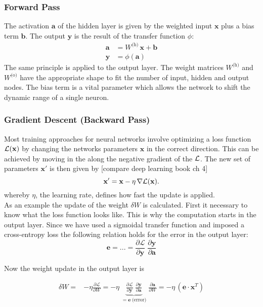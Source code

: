 \subsubsection{Forward Pass}
The activation $\mathbf{a}$ of the hidden layer is given by the weighted input $\mathbf{x}$ plus a bias term $\mathbf{b}$. The output $\mathbf{y}$ is the result of the transfer function $\phi$:
\begin{align}
\mathbf{a} &= W^{\text{(h)}} \, \mathbf{x} + \mathbf{b} \\
\mathbf{y} &= \phi(\mathbf{a})
\end{align} 
The same principle is applied to the output layer. The weight matrices $W^{\text{(h)}}$ and $ W^{\text{(o)}}$ have the appropriate shape to fit the number of input, hidden and output nodes. The bias term is a vital parameter which allows the network to shift the dynamic range of a single neuron.

\subsubsection{Gradient Descent (Backward Pass)}

Most training approaches for neural networks involve optimizing a loss function $\mathcal{L}(\mathbf{x})$ by changing the networks parameters $\mathbf{x}$ in the correct direction. This can be achieved by moving in the along the negative gradient of the $\mathcal{L}$. The new set of parameters $\mathbf{x'}$ is then given by [compare deep learning book ch 4]
\begin{equation}
\mathbf{x'} = \mathbf{x} - \eta \, \nabla\mathcal{L}(\mathbf{x}).
\end{equation}
whereby $\eta$, the learning rate, defines how fast the update is applied.\\

As an example the update of the weight $\delta W$ is calculated. First it necessary to know what the loss function looks like. This is why the computation starts in the output layer. Since we have used a sigmoidal transfer function and imposed a cross-entropy loss the following relation holds for the error in the output layer:
\begin{equation}
\mathbf{e} = ... = \frac{\partial\mathcal{L}}{\partial \mathbf{y}} \;	\frac{\partial \mathbf{y}}{\partial \mathbf{a} }
\end{equation}

Now the weight update in the output layer is

\begin{align}
\delta W =& - \eta \frac{\partial \mathcal{L}}{\partial W} 
= - \eta \;
\underbrace{\frac{\partial\mathcal{L}}{\partial \mathbf{y}} \;
	\frac{\partial \mathbf{y}}{\partial \mathbf{a} }}_{=\mathbf{e}\; \text{(error)}} \;
\frac{\partial \mathbf{a}}{\partial W}
= - \eta \, (\mathbf{e} \cdot \mathbf{x}^T)\\
\end{align}

